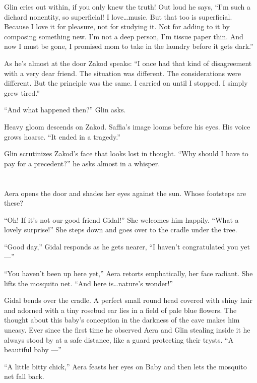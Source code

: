 \documentclass[twoside,11pt,openany]{book}
\begin{document}
Glin cries out within, if you only knew the truth! Out loud he says, ``I'm such a diehard nonentity, so
superficial! I love{\ldots}music. But that too is superficial. Because I love it for pleasure, not for studying it. Not
for adding to it by composing something new. I'm not a deep person, I'm tissue paper thin. And now I must be gone, I
promised mom to take in the laundry before it gets dark.''

As he's almost at the door Zakod speaks: ``I once had that kind of disagreement with a very dear friend.
The situation was different. The considerations were different. But the principle was the same. I carried on until I
stopped. I simply{ }grew tired.''

``And what happened then?'' Glin asks.

Heavy gloom descends on Zakod.  Saffia's image looms before his eyes. His voice grows hoarse. ``It ended
in a tragedy.''

Glin scrutinizes Zakod's face that looks lost in thought. ``Why
should{ }I have to pay for a precedent?'' he asks almost in a
whisper.



\chapter{}

Aera opens the door and shades her eyes against the sun. Whose footsteps are these?

``Oh! If it's not our good friend Gidal!'' She welcomes him happily. ``What a
lovely surprise!'' She steps down and goes over to the
cradle under{ }the tree.

``Good day,'' Gidal responds as he gets nearer, ``I haven't congratulated you yet
---''

``You haven't been up here yet,'' Aera retorts emphatically, her face radiant. She lifts the
mosquito net. ``And here is{\ldots}nature's wonder!''

Gidal bends over the cradle. A perfect small round head covered with shiny hair and adorned with a tiny rosebud ear lies
in a field of pale blue flowers. The thought about this baby's conception in the darkness of the cave makes him
uneasy. Ever since the first time he observed Aera and Glin stealing inside it he always stood by at a safe distance,
like a guard protecting their trysts. ``A beautiful baby ---''

``A little bitty chick,'' Aera feasts her eyes on Baby and then lets the mosquito net fall
back.
\end{document}

